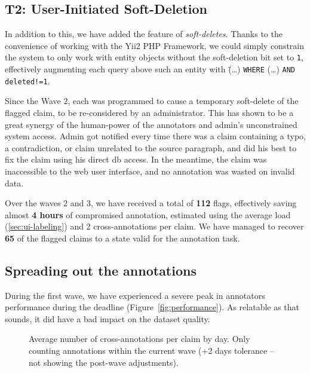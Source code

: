 \subsection{T2: User-Initiated Soft-Deletion}
\label{sec:soft-deletes}
In addition to this, we have added the feature of \textit{soft-deletes}. Thanks to the convenience of working with the \textsf{Yii2 PHP} Framework, we could simply constrain the system to only work with entity objects without the soft-deletion bit set to \texttt{1}, effectively augmenting each query above such an entity with \"{(\dots) \texttt{WHERE} (\dots) \texttt{AND deleted!=1}}.

Since the Wave 2, each  was programmed to cause a temporary soft-delete of the flagged claim, to be re-considered by an administrator. This has shown to be a great synergy of the human-power of the annotators and admin's unconstrained system access. Admin got notified every time there was a claim containing a typo, a contradiction, or claim unrelated to the source paragraph, and did his best to fix the claim using his direct \textsf{db} access. In the meantime, the claim was inaccessible to the web user interface, and no annotation was wasted on invalid data. 

Over the waves 2 and 3, we have received a total of \textbf{112} flags, effectively saving almost \textbf{4 hours} of compromised annotation, estimated using the average \tdva{} load (\ref{sec:ui-labeling})  and 2 cross-annotations per claim. We have managed to recover \textbf{65} of the flagged claims to a state valid for the annotation task.

\subsection{Spreading out the annotations}

During the first wave, we have experienced a severe peak in annotators performance during the deadline (Figure~\ref{fig:performance}). As relatable as that sounds, it did have a bad impact on the dataset quality.

\begin{figure}[H]
\caption[Average number of cross-annotations per claim by day]{Average number of cross-annotations per claim by day. Only counting annotations within the current wave (+2 days tolerance -- not showing the post-wave adjustments).}
\label{fig:crossannotations}
\end{figure} %

